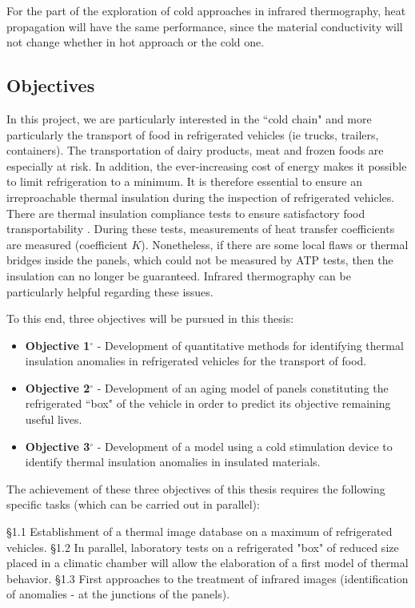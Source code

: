 For the part of the exploration of cold approaches in infrared thermography, heat propagation will have the same performance, since the material conductivity will not change whether in hot approach or the cold one.
\subsection{Objectives}
In this project, we are particularly interested in the ``cold chain" and more particularly the transport of food in refrigerated vehicles (ie trucks, trailers, containers). The transportation of dairy products, meat and frozen foods are especially at risk. In addition, the ever-increasing cost of energy makes it possible to limit refrigeration to a minimum. It is therefore essential to ensure an irreproachable thermal insulation during the inspection of refrigerated vehicles. There are thermal insulation compliance tests to ensure satisfactory food transportability \citep{Geneva1970}. During these tests, measurements of heat transfer coefficients are measured (coefficient $ K $). Nonetheless, if there are some local flaws or thermal bridges inside the panels, which could not be measured by ATP tests, then the insulation can no longer be guaranteed. Infrared thermography can be particularly helpful regarding these issues. %

To this end, three objectives will be pursued in this thesis:
\begin{itemize}
	\item \textbf{Objective 1$ ^\circ $ } - Development of quantitative methods for identifying thermal insulation anomalies in refrigerated vehicles for the transport of food.
	\item \textbf{Objective 2$ ^\circ $ } - Development of an aging model of panels constituting the refrigerated ``box" of the vehicle in order to predict its objective remaining useful lives. 
	\item \textbf{Objective 3$ ^\circ $ } - Development of a model using a cold stimulation device to identify thermal insulation anomalies in insulated materials.
\end{itemize}

The achievement of these three objectives of this thesis requires the following specific tasks (which can be carried out in parallel):

\S 1.1 Establishment of a thermal image database on a maximum of refrigerated vehicles. §1.2 In parallel, laboratory tests on a refrigerated "box" of reduced size placed in a climatic chamber will allow the elaboration of a first model of thermal behavior. §1.3 First approaches to the treatment of infrared images (identification of anomalies - at the junctions of the panels).

